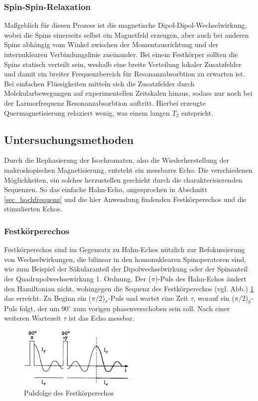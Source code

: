 \subsubsection{Spin-Spin-Relaxation}
Maßgeblich für diesen Prozess ist die magnetische Dipol-Dipol-Wechselwirkung, wobei die Spins einerseits selbst ein Magnetfeld erzeugen, aber auch bei anderen
Spins abhängig vom Winkel zwischen der Momentausrichtung und der internuklearen Verbindungslinie zueinander. Bei einem Festkörper sollten die Spins statisch 
verteilt sein, weshalb eine breite Verteilung lokaler Zusatzfelder und damit ein breiter Frequenzbereich für Resonanzabsorbtion zu erwarten ist. Bei
einfachen Flüssigkeiten mitteln sich die Zusatzfelder durch Molekularbewegungen auf experimentellen Zeitskalen hinaus, sodass nur noch bei der Larmorfrequenz
Resonanzabsorbtion auftritt. Hierbei erzeugte Quermagnetisierung relaxiert wenig, was einem langen $T_2$ entspricht.

\subsection{Untersuchungsmethoden}
Durch die Rephasierung der Isochromaten, also die Wiederherstellung der makroskopischen Magnetisierung, entsteht ein messbares Echo. Die verschiedenen 
Möglichkeiten, ein solches herzustellen geschieht durch die charakterisierenden Sequenzen. So das einfache Hahn-Echo, angesprochen in Abschnitt 
\ref{sec_hochfrequenz} und die hier Anwendung findenden Festkörperechos und die stimulierten Echos.
\subsubsection{Festkörperechos}
Festkörperechos sind im Gegensatz zu Hahn-Echos nützlich zur Refokussierung von Wechselwirkungen, die bilinear in den homonuklearen Spinoperatoren sind, wie
zum Beispiel der Säkularanteil der Dipolwechselwirkung oder der Spinanteil der Quadrupolwechsewirkung 1. Ordnung. Der ($\pi$)-Puls des Hahn-Echos ändert den
Hamiltonian nicht, wohingegen die Sequenz des Festkörperechos (vgl. Abb.) \ref{pic_festEchoFolge} das erreicht. Zu Beginn ein ($\pi/2$)$_x$-Puls und wartet
eine Zeit $\tau$, worauf ein ($\pi/2$)$_y$-Puls folgt, der um 90$^\circ$ zum vorigen phasenverschoben sein soll. Nach einer weiteren Wartezeit $\tau$ ist das
Echo messbar. 
\begin{figure}[htbp]
 \includegraphics[width=0.5\textwidth]{../pics/festEchoFolge.jpg}
 \caption{Pulsfolge des Festkörperechos}
 \label{pic_festEchoFolge}
\end{figure}
\noindent

